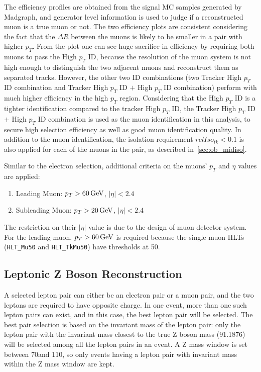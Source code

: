 \vspace{0.3cm}
The efficiency profiles are obtained from the signal MC samples generated by Madgraph, and generator level information is used to judge if a reconstructed muon is a true muon or not. The two efficiency plots are consistent considering the fact that the $\Delta R$ between the muons is likely to be smaller in a pair with higher $p_T$. From the plot one can see huge sacrifice in efficiency by requiring both muons to pass the High $p_T$ ID, because the resolution of the muon system is not high enough to distinguish the two adjacent muons and reconstruct them as separated tracks. However, the other two ID combinations (two Tracker High $p_T$ ID combination and Tracker High $p_T$ ID $+$ High $p_T$ ID combination) perform with much higher efficiency in the high $p_T$ region. Considering that the High $p_T$ ID is a tighter identification compared to the tracker High $p_T$ ID, the Tracker High $p_T$ ID $+$ High $p_T$ ID combination is used as the muon identification in this analysis, to secure high selection efficiency as well as good muon identification quality. In addition to the muon identification, the isolation requirement $relIso_{tk}<0.1$ is also applied for each of the muons in the pair, as described in~\ref{sec:ob_midiso}.

\vspace{0.3cm}
Similar to the electron selection, additional criteria on the muons' $p_T$ and $\eta$ values are applied:
\begin{enumerate}
\item Leading Muon: $p_T >60\,\text{Ge\hspace{-.08em}V}$, $|\eta|<2.4$
\item Subleading Muon: $p_T >20\,\text{Ge\hspace{-.08em}V}$, $|\eta|<2.4$
\end{enumerate}

The restriction on their $|\eta|$ value is due to the design of muon detector system. For the leading muon, $p_T >60\,\text{Ge\hspace{-.08em}V}$ is required because the single muon HLTs (\texttt{HLT\_Mu50} and \texttt{HLT\_TkMu50}) have thresholds at 50\GeV.

\subsection{Leptonic Z Boson Reconstruction}
A selected lepton pair can either be an electron pair or a muon pair, and the two leptons are required to have opposite charge. In one event, more than one such lepton pairs can exist, and in this case, the best lepton pair will be selected. The best pair selection is based on the invariant mass of the lepton pair: only the lepton pair with the invariant mass closest to the true Z boson mass (91.1876\GeV) will be selected among all the lepton pairs in an event. A Z mass window is set between 70\GeV and 110\GeV, so only events having a lepton pair with invariant mass within the Z mass window are kept.

